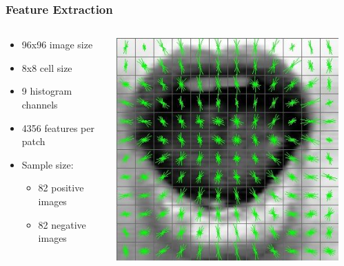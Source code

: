 \documentclass[serif,14pt]{beamer}
\begin{document}
\begin{frame}
  \frametitle{Feature Extraction}
  \begin{columns}[onlytextwidth]
      \begin{column}{0.6\textwidth}
    \begin{itemize}
		\item 96x96 image size
        \item 8x8 cell size
        \item 9 histogram channels
        \item 4356 features per patch
	\end{itemize}
    
    \vspace{0.5cm}
     
        \begin{itemize}
			\item Sample size:
             \begin{itemize}
				\item 82 positive images
                \item 82 negative images
			\end{itemize}
		\end{itemize}
    
    \end{column}
    \begin{column}{0.4\textwidth}
      \centering
      \includegraphics[scale=0.3]{slide3.jpg}
    \end{column}

​  \end{columns}
\end{frame}
\end{document}
